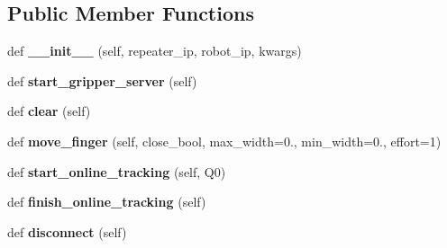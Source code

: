 \subsection*{Public Member Functions}
\begin{DoxyCompactItemize}
\item 
\mbox{\label{classrnb-planning_1_1src_1_1pkg_1_1controller_1_1repeater_1_1panda__repeater_1_1_panda_repeater_a76fbc85065c3ab8b81931bd44954a791}} 
def {\bfseries \+\_\+\+\_\+init\+\_\+\+\_\+} (self, repeater\+\_\+ip, robot\+\_\+ip, kwargs)
\item 
\mbox{\label{classrnb-planning_1_1src_1_1pkg_1_1controller_1_1repeater_1_1panda__repeater_1_1_panda_repeater_a1eae831a56c981018d2b446ef65ed3b8}} 
def {\bfseries start\+\_\+gripper\+\_\+server} (self)
\item 
\mbox{\label{classrnb-planning_1_1src_1_1pkg_1_1controller_1_1repeater_1_1panda__repeater_1_1_panda_repeater_a94ca393730578d49a7e50c617db743e2}} 
def {\bfseries clear} (self)
\item 
\mbox{\label{classrnb-planning_1_1src_1_1pkg_1_1controller_1_1repeater_1_1panda__repeater_1_1_panda_repeater_a2491a7f93f643f963b0935152c5b28e2}} 
def {\bfseries move\+\_\+finger} (self, close\+\_\+bool, max\+\_\+width=0., min\+\_\+width=0., effort=1)
\item 
\mbox{\label{classrnb-planning_1_1src_1_1pkg_1_1controller_1_1repeater_1_1panda__repeater_1_1_panda_repeater_af9449f210ec61de3cc3ff201ce3a48bc}} 
def {\bfseries start\+\_\+online\+\_\+tracking} (self, Q0)
\item 
\mbox{\label{classrnb-planning_1_1src_1_1pkg_1_1controller_1_1repeater_1_1panda__repeater_1_1_panda_repeater_ac6e16ff6c8f5baaaf0e07e8296b48f24}} 
def {\bfseries finish\+\_\+online\+\_\+tracking} (self)
\item 
\mbox{\label{classrnb-planning_1_1src_1_1pkg_1_1controller_1_1repeater_1_1panda__repeater_1_1_panda_repeater_ac67ffdb40b2e566f0ec5c06964d7acf3}} 
def {\bfseries disconnect} (self)
\end{DoxyCompactItemize}
